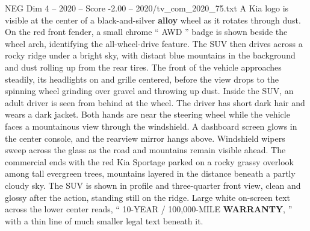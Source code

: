\begin{textsample}{NEG Dim 4 – 2020 – Score -2.00 – 2020/tv\_com\_2020\_75.txt}
A Kia logo is visible at the center of a black-and-silver \textbf{alloy} wheel as it rotates through dust.
On the red front fender, a small chrome “ AWD ” badge is shown beside the wheel arch, identifying the all-wheel-drive feature.
The SUV then drives across a rocky ridge under a bright sky, with distant blue mountains in the background and dust rolling up from the rear tires.
The front of the vehicle approaches steadily, its headlights on and grille centered, before the view drops to the spinning wheel grinding over gravel and throwing up dust.
Inside the SUV, an adult driver is seen from behind at the wheel.
The driver has short dark hair and wears a dark jacket.
Both hands are near the steering wheel while the vehicle faces a mountainous view through the windshield.
A dashboard screen glows in the center console, and the rearview mirror hangs above.
Windshield wipers sweep across the glass as the road and mountains remain visible ahead.
The commercial ends with the red Kia Sportage parked on a rocky grassy overlook among tall evergreen trees, mountains layered in the distance beneath a partly cloudy sky.
The SUV is shown in profile and three-quarter front view, clean and glossy after the action, standing still on the ridge.
Large white on-screen text across the lower center reads, “ 10-YEAR / 100,000-MILE \textbf{WARRANTY}, ” with a thin line of much smaller legal text beneath it.

\end{textsample}

